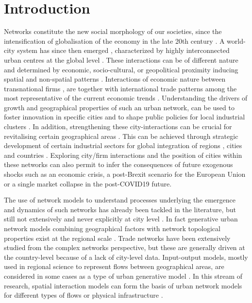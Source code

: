 \documentclass[10pt,letterpaper]{article}
\begin{document}
\linenumbers


\cite{rozenblat2021intra}



\section*{Introduction}

Networks constitute the new social morphology of our societies, since the intensification of globalisation of the economy in the late 20th century \cite{castells2000networksociety}. A world-city system has since then emerged \cite{taylor2001specification}, characterized by highly interconnected urban centres at the global level \cite{sassen1991}. These interactions can be of different nature and determined by economic, socio-cultural, or geopolitical proximity inducing spatial and non-spatial patterns \cite{martinus2018global}. Interactions of economic nature between transnational firms \cite{derudder2018central}, are together with international trade patterns among the most representative of the current economic trends \cite{taylor2001specification}. Understanding the drivers of growth and geographical properties of such an urban network, can be used to foster innovation in specific cities and to shape public policies for local industrial clusters \cite{turkina2016structure}. In addition, strengthening these city-interactions can be crucial for revitalising certain geographical areas \cite{Clarke2018}. This can be achieved through strategic development of certain industrial sectors for global integration of regions \cite{dawley2019creating}, cities \cite{gluckler2016relational} and countries \cite{martinus2019brokerage}. Exploring city/firm interactions \cite{storme2019introducing} and the position of cities within these networks \cite{gluckler2016relational} can also permit to infer the consequences of future exogenous shocks such as an economic crisis, a post-Brexit scenario for the European Union or a single market collapse in the post-COVID19 future.

The use of network models to understand processes underlying the emergence and dynamics of such networks has already been tackled in the literature, but still not extensively and never explicitly at city level \cite{taylor2001specification}. In fact generative urban network models combining geographical factors with network topological properties exist at the regional scale {\cite{dai2016simulating}}. Trade networks have been extensively studied from the complex networks perspective, but these are generally driven at the country-level \cite{garlaschelli2005structure} because of a lack of city-level data. Input-output models, mostly used in regional science to represent flows between geographical areas, are considered in some cases as a type of urban generative model \cite{jin1993generation}. In this stream of research, spatial interaction models \cite{dennett2013multilevel} can form the basis of urban network models for different types of flows \cite{dai2016generative} or physical infrastructure \cite{raimbault2018indirect}.  
\end{document}
